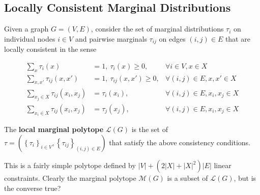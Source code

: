 \documentclass[11pt]{elegantbook}
\begin{document}
\subsection{Locally Consistent Marginal Distributions}
Given a graph $G = (V,E)$, consider the set of marginal distributions $\tau_i$ on individual nodes $i \in V$ and pairwise marginals $\tau_{ij}$ on edges $(i, j) \in E$ that are locally consistent in the sense

\begin{equation}
    \begin{aligned}
        \sum_x \tau_i(x)&=1,\ \tau_i(x)\geq 0,& \forall i\in V,x\in X\\
        \sum_{x,x'}\tau_{ij}(x,x')&=1,\ \tau_{ij}(x,x')\geq 0,& \forall (i,j)\in E,x,x'\in X\\
        \sum_{x_j\in X}\tau_{ij}(x_i,x_j)&=\tau_i(x_i),& \forall (i,j)\in E, x_i,x_j\in X\\
        \sum_{x_i\in X}\tau_{ij}(x_i,x_j)&=\tau_j(x_j),& \forall (i,j)\in E, x_i,x_j\in X
    \end{aligned}
    \nonumber
\end{equation}

\begin{definition}
    The \textbf{local marginal polytope} $\mathcal{L}(G)$ is the set of $\tau=\left(\left\{\tau_i\right\}_{i \in V},\left\{\tau_{i j}\right\}_{(i, j) \in E}\right)$ that satisfy the above consistency conditions.
\end{definition}

This is a fairly simple polytope defined by $|V|+\left(2|X|+|X|^2\right)|E|$ linear constraints. Clearly the marginal polytope $\mathcal{M}(G)$ is a subset of $\mathcal{L}(G)$, but is the converse true?
\end{document}
